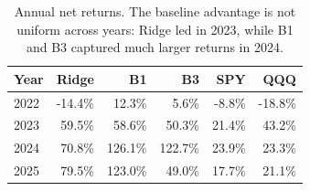 \begin{table}[H]
\centering
\small
\begin{tabular}{lrrrrr}
\toprule
Year & Ridge & B1 & B3 & SPY & QQQ \\
\midrule
2022 & -14.4\% & 12.3\% & 5.6\% & -8.8\% & -18.8\% \\
2023 & 59.5\% & 58.6\% & 50.3\% & 21.4\% & 43.2\% \\
2024 & 70.8\% & 126.1\% & 122.7\% & 23.9\% & 23.3\% \\
2025 & 79.5\% & 123.0\% & 49.0\% & 17.7\% & 21.1\% \\
\bottomrule
\end{tabular}
\caption{Annual net returns. The baseline advantage is not uniform across years: Ridge led in 2023, while B1 and B3 captured much larger returns in 2024.}
\label{tab:annual}
\end{table}
